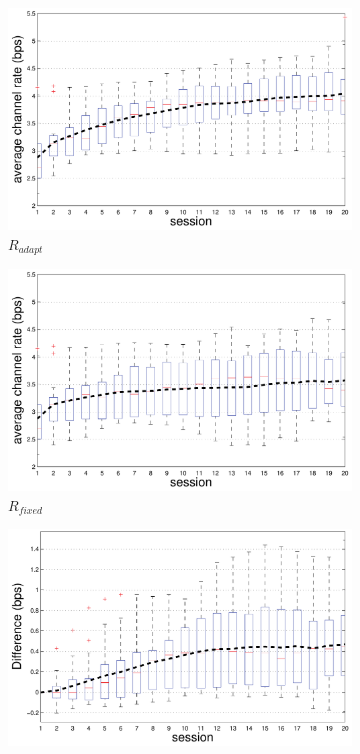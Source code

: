 \documentclass{sigchi}
\begin{document}
\begin{figure}
  \centering
  \begin{subfigure}[b]{0.3\textwidth}
    \includegraphics[width=\textwidth]{figures/IUI_BPS_p_adapt.pdf}
    \caption{$R_{adapt}$}
    \label{fig:channel_rate_adapt}
  \end{subfigure}
  \begin{subfigure}[b]{0.3\textwidth}
    \includegraphics[width=\textwidth]{figures/IUI_BPS_p_first.pdf}
    \caption{$R_{fixed}$}
    \label{fig:channel_rate_fixed}
  \end{subfigure}
  \begin{subfigure}[b]{0.3\textwidth}
    \includegraphics[width=\textwidth]{figures/IUI_BPS_diff_p_first.pdf}

\end{subfigure}
\end{figure}
\end{document}
